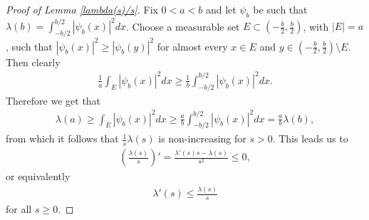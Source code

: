 \documentclass[11pt, a4paper, reqno]{amsart}
\theoremstyle{remark}
\begin{document}
\begin{proof}[Proof of Lemma \ref{lambda(s)/s}]
Fix $0<a<b$ and let $\psi_b$ be such that $\lambda(b) = \int_{-b/2}^{b/2}|\psi_b(x)|^2dx$. Choose a measurable set \(E\subset (-\tfrac{b}{2}, \tfrac{b}{2})\), with \(|E|=a\), such that \(|\psi_b(x)|^2\geq |\psi_b(y)|^2\) for almost every \(x\in E\) and \(y\in (-\tfrac{b}{2}, \tfrac{b}{2})\setminus E\). Then clearly 
\begin{align*}
    \frac{1}{a}\int_E |\psi_b(x)|^2dx \geq \frac{1}{b}\int_{-b/2}^{b/2} |\psi_b(x)|^2dx.
\end{align*}
Therefore we get that 
\begin{align*}
    \lambda(a) \geq \int_E |\psi_b(x)|^2dx \geq \frac{a}{b}\int_{-b/2}^{b/2} |\psi_b(x)|^2dx = \frac{a}{b}\lambda(b),
\end{align*}
from which it follows that $\frac{1}{s}\lambda(s)$ is non-increasing for $s> 0$.
This leads us to
\begin{align*}
    \left(\frac{\lambda(s)}{s}\right)' = \frac{\lambda'(s)s-\lambda(s)}{s^2} \leq 0,
\end{align*}
or equivalently 
\begin{align*}
   \lambda'(s) \leq \frac{\lambda(s)}{s}
\end{align*}
for all $s\geq 0$.
\end{proof}
\end{document}
